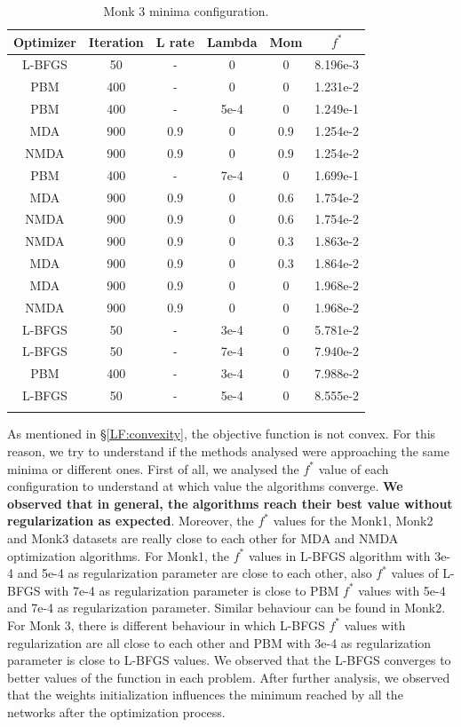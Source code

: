 \begin{longtable}{|c|c|c|c|c|c|}
	\hline
	\centering
	\textbf{Optimizer}&\textbf{Iteration} & \textbf{L rate} & \multicolumn{1}{l|}{\textbf{Lambda}} & \textbf{Mom} & \textbf{$f^{*}$} \\ \hline 
	L-BFGS & 50 & - & 0  & 0 & 8.196e-3 		\\
	PBM & 400 & - & 0  & 0 & 1.231e-2 			\\
	PBM & 400 & - & 5e-4  & 0 & 1.249e-1 		\\
	MDA & 900 & 0.9 & 0  & 0.9 & 1.254e-2 	\\
	NMDA & 900 & 0.9 & 0  & 0.9 & 1.254e-2 	\\
	PBM & 400 & - & 7e-4  & 0 & 1.699e-1 		\\
	MDA & 900 & 0.9 & 0  & 0.6 & 1.754e-2 	\\
	NMDA & 900 & 0.9 & 0  & 0.6 & 1.754e-2 	\\
	NMDA & 900 & 0.9 & 0  & 0.3 & 1.863e-2 	\\
	MDA & 900 & 0.9 & 0  & 0.3 & 1.864e-2 	\\
	MDA & 900 & 0.9 & 0  & 0 & 1.968e-2 		\\
	NMDA & 900 & 0.9 & 0  & 0 & 1.968e-2 	\\
	L-BFGS & 50 & - & 3e-4  & 0  & 5.781e-2 	\\
	L-BFGS & 50 & - & 7e-4  & 0  & 7.940e-2 	\\
	PBM & 400 & - & 3e-4  & 0 & 7.988e-2 		\\
	L-BFGS & 50 & - & 5e-4  & 0  & 8.555e-2 	\\
	\hline
	\caption{Monk 3 minima configuration.}
	\label{tab:nets_res_plots_Monk3}
\end{longtable}


As mentioned in \S\ref{LF:convexity}, the objective function is not convex. For this reason, we try to understand if the methods analysed were approaching the same minima or different ones.
First of all, we analysed the $f^{*}$ value of each configuration to understand at which value the algorithms converge. \textbf{We observed that in general, the algorithms reach their best value without regularization as expected}. Moreover, the $f^{*}$ values for the Monk1, Monk2 and Monk3 datasets are really close to each other for MDA and NMDA optimization algorithms. For Monk1, the $f^{*}$ values in L-BFGS algorithm with 3e-4 and 5e-4 as regularization parameter are close to each other, also $f^{*}$ values of L-BFGS with 7e-4 as regularization parameter is close to PBM $f^{*}$ values with 5e-4 and 7e-4 as regularization parameter. Similar behaviour can be found in Monk2. For Monk 3, there is different behaviour in which L-BFGS $f^{*}$ values with regularization are all close to each other and PBM with 3e-4 as regularization parameter is close to L-BFGS values. We observed that the L-BFGS converges to better values of the function in each problem. After further analysis, we observed that the weights initialization influences the minimum reached by all the networks after the optimization process.



